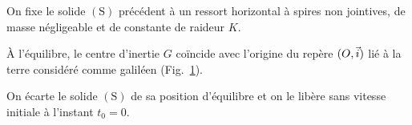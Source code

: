 \begin{minipage}{0.65\linewidth}
    On fixe le solide $\mathrm{(S)}$ précédent à un ressort horizontal à spires
    non jointives, de masse négligeable et de constante de raideur $K$.
    
    À l'équilibre, le centre d'inertie $G$ coïncide avec l'origine du repère
    $(O,\vec{i})$ lié à la terre considéré comme galiléen
    (Fig.~\ref{fig:solide_ressort}).
    
    On écarte le solide $\mathrm{(S)}$ de sa position d'équilibre et on le
    libère sans vitesse initiale à l'instant $t_{0}=0$.
\end{minipage}
\hfill
\begin{minipage}{0.33\linewidth}
    \begin{figure}[H]
        \centering
        
        \caption{}
        \label{fig:solide_ressort}
    \end{figure}
\end{minipage}

